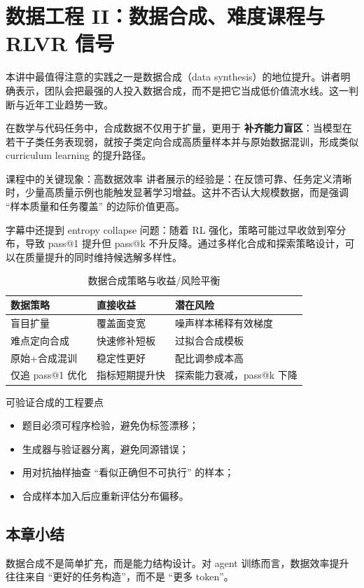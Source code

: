 \section{数据工程 II：数据合成、难度课程与 RLVR 信号}

本讲中最值得注意的实践之一是数据合成（data synthesis）的地位提升。讲者明确表示，团队会把最强的人投入数据合成，而不是把它当成低价值流水线。这一判断与近年工业趋势一致。

在数学与代码任务中，合成数据不仅用于扩量，更用于 \textbf{补齐能力盲区}：当模型在若干子类任务表现弱，就按子类定向合成高质量样本并与原始数据混训，形成类似 curriculum learning 的提升路径。

\begin{importantbox}{课程中的关键现象：高数据效率}
讲者展示的经验是：在反馈可靠、任务定义清晰时，少量高质量示例也能触发显著学习增益。这并不否认大规模数据，而是强调 ``样本质量和任务覆盖'' 的边际价值更高。
\end{importantbox}

字幕中还提到 entropy collapse 问题：随着 RL 强化，策略可能过早收敛到窄分布，导致 pass@1 提升但 pass@k 不升反降。通过多样化合成和探索策略设计，可以在质量提升的同时维持候选解多样性。

\begin{table}[H]
\centering
\begin{tabular}{p{3.0cm}p{4.0cm}p{4.5cm}}
\toprule
\textbf{数据策略} & \textbf{直接收益} & \textbf{潜在风险} \\
\midrule
盲目扩量 & 覆盖面变宽 & 噪声样本稀释有效梯度 \\
难点定向合成 & 快速修补短板 & 过拟合合成模板 \\
原始+合成混训 & 稳定性更好 & 配比调参成本高 \\
仅追 pass@1 优化 & 指标短期提升快 & 探索能力衰减，pass@k 下降 \\
\bottomrule
\end{tabular}
\caption{数据合成策略与收益/风险平衡}
\end{table}

\begin{knowledgebox}{可验证合成的工程要点}
\begin{itemize}
    \item 题目必须可程序检验，避免伪标签漂移；
    \item 生成器与验证器分离，避免同源错误；
    \item 用对抗抽样抽查 ``看似正确但不可执行'' 的样本；
    \item 合成样本加入后应重新评估分布偏移。
\end{itemize}
\end{knowledgebox}

\subsection{本章小结}
数据合成不是简单扩充，而是能力结构设计。对 agent 训练而言，数据效率提升往往来自 ``更好的任务构造''，而不是 ``更多 token''。

